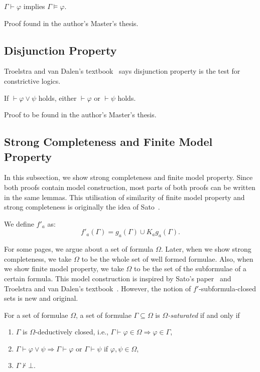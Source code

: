   \begin{theorem}[Soundness]
   \label{soundness}
   $\Gamma\vdash\varphi$ implies $\Gamma\models\varphi$.
  \end{theorem}
  Proof found in the author's Master's thesis.

  \subsection{Disjunction Property}

  Troelstra and van Dalen's
  textbook~\cite[3.5]{troelstra1988constructivism} says
  disjunction property is the test for constrictive logics.

   \begin{theorem}
    \label{disjunction-property}
    If $\vdash\varphi\vee\psi$ holds, either $\vdash\varphi$ or $\vdash\psi$ holds.
   \end{theorem}
   Proof to be found in the author's Master's thesis.

  \subsection{Strong Completeness and Finite Model Property}

  In this subsection, we show strong completeness and finite model property.
  Since both proofs contain model construction,
  most parts of both proofs can be written in the same lemmas.
  This utilisation of similarity of finite model property and strong completeness
  is originally the idea of
  Sato~\cite{sato13study}.

  \begin{definition}
   We define $f'_a$ as:
   \[
   f'_a(\Gamma) = g_a(\Gamma) \cup K_ag_a(\Gamma).
   \]
  \end{definition}

  For some pages, we argue about a
  set of formula $\Omega$. Later, when we show
  strong completeness, we take $\Omega$ to be the whole set of well formed formulae.  Also,
  when we show finite model property, we take $\Omega$ to be the set of the subformulae of a
  certain formula.  This model construction is inspired by
  Sato's paper~\cite{sato13study}
  and Troelstra and van Dalen's textbook~\cite{troelstra1988constructivism}.
  However, the notion of $f'$-subformula-closed sets is new and original.

  \begin{definition}
   \label{saturated-set}
   For a set of formulae $\Omega$,
   a set of formulae $\Gamma\subseteq\Omega$ is \textit{$\Omega$-saturated} if and only if
   \begin{enumerate}
    \item $\Gamma$ is $\Omega$-deductively closed, i.e., $\Gamma\vdash\varphi\in
	  \Omega\Rightarrow
	  \varphi\in\Gamma$,
    \item $\Gamma\vdash\varphi\vee\psi \Rightarrow \Gamma\vdash\varphi$ or $\Gamma\vdash\psi$
	  if $\varphi,\psi\in\Omega$,
    \item $\Gamma\not\vdash\bot$.
   \end{enumerate}
  \end{definition}

